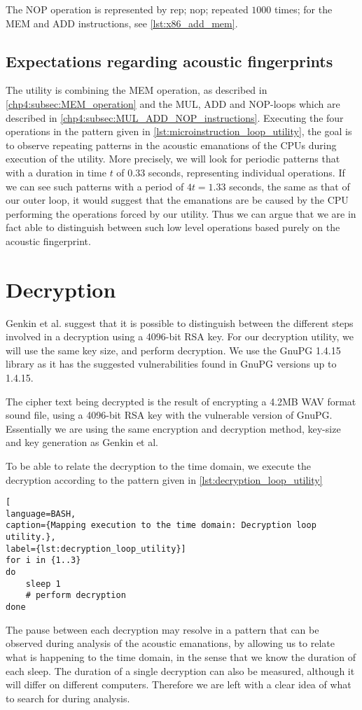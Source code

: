 The NOP operation is represented by rep; nop; repeated \(1000\) times; for the MEM and ADD instructions, see \autoref{lst:x86_add_mem}.


\subsection{Expectations regarding acoustic fingerprints}
The utility is combining the MEM operation, as described in \autoref{chp4:subsec:MEM_operation} and the MUL, ADD and NOP-loops which are described in \autoref{chp4:subsec:MUL_ADD_NOP_instructions}.
Executing the four operations in the pattern given in \autoref{lst:microinstruction_loop_utility}, the goal is to observe repeating patterns in the acoustic emanations of the \gls{CPU}s during execution of the utility.
More precisely, we will look for periodic patterns that with a duration in time \(t\) of \(0.33\) seconds, representing individual operations. 
If we can see such patterns with a period of \(4t = 1.33\) seconds, the same as that of our outer loop, it would suggest that the emanations are be caused by the \gls{CPU} performing the operations forced by our utility.
Thus we can argue that we are in fact able to distinguish between such low level operations based purely on the acoustic fingerprint. 



\section{Decryption}\label{chp4:sec:decryption}
Genkin et al. suggest that it is possible to distinguish between the different steps involved in a decryption using a 4096-bit RSA key.
For our decryption utility, we will use the same key size, and perform decryption. 
We use the GnuPG 1.4.15~\cite{url:GnuPG_1.4.15} library as it has the suggested vulnerabilities found in GnuPG versions up to 1.4.15\cite[Sec.~9.1]{DBLP:conf/crypto/GenkinST14}. 

The cipher text being decrypted is the result of encrypting a 4.2MB WAV format sound file, using a 4096-bit RSA key with the vulnerable version of GnuPG.
Essentially we are using the same encryption and decryption method, key-size and key generation as Genkin et al. 

To be able to relate the decryption to the time domain, we execute the decryption according to the pattern given in \autoref{lst:decryption_loop_utility}

\begin{lstlisting}[
language=BASH, 
caption={Mapping execution to the time domain: Decryption loop utility.}, 
label={lst:decryption_loop_utility}]
for i in {1..3}
do
    sleep 1
    # perform decryption
done
\end{lstlisting}

The pause between each decryption may resolve in a pattern that can be observed during analysis of the acoustic emanations, by allowing us to relate what is happening to the time domain, in the sense that we know the duration of each sleep.
The duration of a single decryption can also be measured, although it will differ on different computers.
Therefore we are left with a clear idea of what to search for during analysis.
